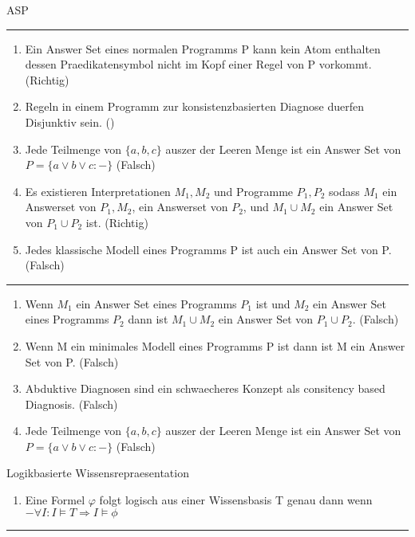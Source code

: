 \documentclass[a4paper,oneside,10pt,DIV12,headsepline,footexclude,headexclude]{scrartcl}
\begin{document}
\begin{section}{ASP}
    \rule{\textwidth}{1pt}
    \begin{enumerate}
    \item Ein Answer Set eines normalen Programms P kann kein Atom enthalten dessen Praedikatensymbol nicht im Kopf einer Regel von P vorkommt. (Richtig)
    \item Regeln in einem Programm zur konsistenzbasierten Diagnose duerfen Disjunktiv sein. ()
    \item Jede Teilmenge von $\{a,b,c\}$ auszer der Leeren Menge ist ein Answer Set von $ P = \{a \vee b \vee c :-\}$ (Falsch)
    \item Es existieren Interpretationen $M_1, M_2$ und Programme $P_1, P_2$ sodass $M_1$ ein Answerset von $P_1, M_2$, ein Answerset von $P_2$, und $M_1 \cup M_2$ ein Answer Set von $P_1 \cup P_2$ ist. (Richtig)
    \item Jedes klassische Modell eines Programms P ist auch ein Answer Set von P. (Falsch)
    \end{enumerate}
    \rule{\textwidth}{1pt}
    \begin{enumerate}
    \item Wenn $M_1$ ein Answer Set eines Programms $P_1$ ist und $M_2$ ein Answer Set eines Programms $P_2$ dann ist $M_1 \cup M_2$ ein Answer Set von $P_1 \cup P_2$. (Falsch)
    \item Wenn M ein minimales Modell eines Programms P ist dann ist M ein Answer Set von P. (Falsch)
    \item Abduktive Diagnosen sind ein schwaecheres Konzept als consitency based Diagnosis. (Falsch)
    \item Jede Teilmenge von $\{a,b,c\}$ auszer der Leeren Menge ist ein Answer Set von $ P = \{a \vee b \vee c :-\}$ (Falsch)
    \end{enumerate}

    \end{section}

    \begin{section}{Logikbasierte Wissensrepraesentation}
    \begin{enumerate}
    \item Eine Formel $\varphi$ folgt logisch aus einer Wissensbasis T genau dann wenn
    $- \forall I : I \models T \Rightarrow I \models \phi$
    \end{enumerate}
    \end{section}

    \rule{\textwidth}{1pt}
\end{document}
